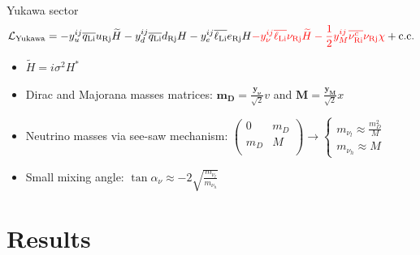 \documentclass[10pt,xcolor=dvipsnames,mathserif]{beamer}
\renewcommand{\(}{\left(}
\renewcommand{\)}{\right)}
\renewcommand{\[}{\left[}
\renewcommand{\]}{\right]}
\newcommand{\red}[0]{\color{red}}
\begin{document}
\begin{frame}{Yukawa sector}
	\begin{equation*}
	\begin{aligned}
	\mathcal{L}_\mathrm{Yukawa} = 
	-y_u^{ij} \overline{q_\mathrm{L i}} u_\mathrm{R j} \widetilde{H} 
	-y_d^{ij} \overline{q_\mathrm{L i}} d_\mathrm{R j} H
	-y_e^{ij} \overline{\ell_\mathrm{L i}} e_\mathrm{R j} H
	{\red - y_\nu^{ij} \overline{\ell_\mathrm{L i}} \nu_\mathrm{R j} \widetilde{H}
		-\dfrac{1}{2} y_M^{ij} \overline{\nu_\mathrm{R i}^c} \nu_\mathrm{R j} \chi} + \mathrm{c.c.}
	\end{aligned}
	\end{equation*}
	\begin{itemize}
		\item $\widetilde{H} = i \sigma^2 H^*$
		\vskip2mm
		\item Dirac and Majorana masses matrices: $\bm{m_D} = \tfrac{\bm{y_\nu}}{\sqrt{2}} v$ and $\bm{M} = \tfrac{\bm{y_M}}{\sqrt{2}} x$
		\item Neutrino masses via see-saw mechanism: $\begin{pmatrix}
		0 & m_D \\
		m_D & M\\
		\end{pmatrix} \rightarrow 
		\begin{cases}
		m_{\nu_l} \approx \tfrac{m_D^2}{M}\\
		m_{\nu_h} \approx M
		\end{cases}$
		\item Small mixing angle: $\tan \alpha_\nu \approx -2 \sqrt{\tfrac{m_{\nu_l}}{m_{\nu_h}}}$
	\end{itemize}
	
\end{frame}

\section{Results}
\end{document}
